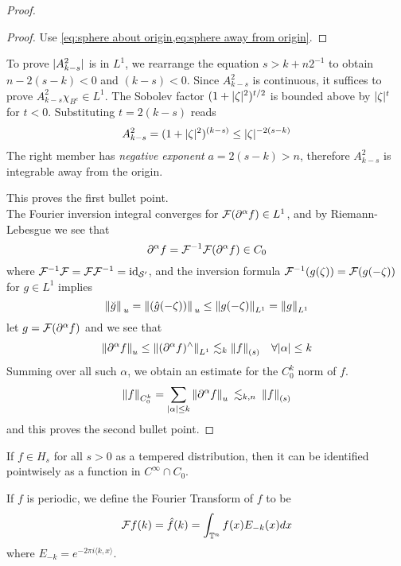 \documentclass[../main-v2-manifolds.tex]{subfiles}
\begin{document}
\begin{proof}
\begin{note}[Integrability of $C$]
\begin{proof}
    Use \cref{eq:sphere about origin,eq:sphere away from origin}.
\end{proof}
To prove $\vert {A^2_{k-s}} \vert$ is in $L^1$, we rearrange the equation $s> k + n2^{-1}$ to obtain $n - 2(s-k)<0$ and $(k-s)<0$. Since $A^2_{k-s}$ is continuous, it suffices to prove $A^2_{k-s}\chi_{B^c}\in L^1$. The Sobolev factor $(1+\vert {\zeta} \vert^2)^{t/2}$ is bounded above by $\vert {\zeta} \vert^{t}$ for $t<0$. Substituting  $t = 2(k-s)$ reads
\[
    A_{k-s}^2 = (1+\vert {\zeta} \vert^2)^{(k-s)}\leq \vert {\zeta} \vert^{-2(s-k)}
\]
The right member has \emph{negative exponent} $a = 2(s-k) > n$, therefore $A_{k-s}^2$ is integrable away from the origin.
\end{note}

This proves the first bullet point.\\

The Fourier inversion integral converges for $\mathcal{F}(\partial^\alpha f)\in L^1$, and by Riemann-Lebesgue we see that 
\[
\partial^\alpha f=\mathcal{F}^{-1}\mathcal{F}(\partial^\alpha f)\in C_0
\]
where $\mathcal{F}^{-1}\mathcal{F} = \mathcal{F}\mathcal{F}^{-1} = \operatorname{id}_{\mathcal{S}'}$, and the inversion formula $\mathcal{F}^{-1}(g(\zeta)) = \mathcal{F}(g(-\zeta))$ for $g\in L^1$ implies
\[
\norm*{\breve{g}}_u = \norm*{(\hat{g}(-\zeta))}_u\leq \norm{g(-\zeta)}_{L^1}=\norm{g}_{L^1}
\]
let $g = \mathcal{F}(\partial^\alpha f)$ and we see that
\[
\norm{\partial^\alpha f}_u\leq \norm{(\partial^\alpha f)^{\wedge}}_{L^1}\lesssim_k \norm{f}_{(s)}\quad\forall \vert {\alpha} \vert\leq k
\]
Summing over all such $\alpha$, we obtain an estimate for the $C_0^k$ norm of $f$.
\[
\norm{f}_{C_0^k} =\sum_{\vert {\alpha} \vert\leq k}\norm{\partial^\alpha f}_u \:\lesssim_{k,n}\: \norm{f}_{(s)}
\]
and this proves the second bullet point.
\end{proof}
\begin{corollary}
If $f\in H_s$ for all $s>0$ as a tempered distribution, then it can be identified pointwisely as a function in $C^\infty\cap C_0$.
\end{corollary}
If $f$ is periodic, we define the Fourier Transform of $f$ to be
\begin{equation}
    \mathcal{F} f(k) = \hat{f}(k) = \int_{{\mathbb{T}^n}}f(x)E_{-k}(x)dx
    \label{eq:fourier transform torusn l1}
\end{equation}
where $E_{-k} = e^{-2\pi i \langle k, x\rangle}$.\\
\end{document}
